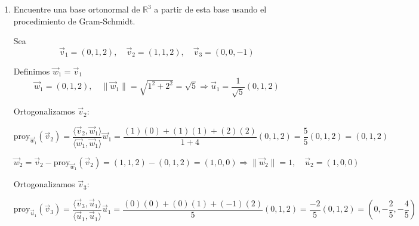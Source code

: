 \documentclass[a4paper]{article}
\begin{document}
\begin{enumerate}
\begin{enumerate}
Calculamos su determinante:

\[
\det(M) = 
\begin{vmatrix}
0 & 1 & 0 \\
1 & 1 & 0 \\
2 & 2 & -1
\end{vmatrix}
= 0 \cdot \begin{vmatrix} 1 & 0 \\ 2 & -1 \end{vmatrix}
- 1 \cdot \begin{vmatrix} 1 & 0 \\ 2 & -1 \end{vmatrix}
+ 0 \cdot \begin{vmatrix} 1 & 1 \\ 2 & 2 \end{vmatrix}
= - (1 \cdot (-1) - 0 \cdot 2) = -(-1) = 1
\]

Como el determinante es distinto de cero, los vectores son linealmente independientes, por lo tanto, al ser 3 vectores en espacio de dimensión 3, éstos forman una base de \( \mathbb{R}^3 \).

\vspace{0.4cm}

\item Encuentre una base ortonormal de \( \mathbb{R}^3 \) a partir de esta base usando el procedimiento de Gram-Schmidt.

Sea
\[
\vec{v}_1 = (0,1,2), \quad \vec{v}_2 = (1,1,2), \quad \vec{v}_3 = (0,0,-1)
\]

Definimos \( \vec{w}_1 = \vec{v}_1 \)
\[
\vec{w}_1 = (0,1,2), \quad
\|\vec{w}_1\| = \sqrt{1^2 + 2^2} = \sqrt{5}
\Rightarrow \vec{u}_1 = \frac{1}{\sqrt{5}}(0,1,2)
\]


Ortogonalizamos \( \vec{v}_2 \):

\[
\text{proy}_{\vec{w}_1}(\vec{v}_2) = \frac{\langle \vec{v}_2, \vec{w}_1 \rangle}{\langle \vec{w}_1, \vec{w}_1 \rangle} \vec{w}_1
= \frac{(1)(0)+(1)(1)+(2)(2)}{1+4} (0,1,2) = \frac{5}{5}(0,1,2) = (0,1,2)
\]

\[
\vec{w}_2 = \vec{v}_2 - \text{proy}_{\vec{w}_1}(\vec{v}_2) = (1,1,2) - (0,1,2) = (1,0,0)
\Rightarrow \|\vec{w}_2\| = 1, \quad \vec{u}_2 = (1,0,0)
\]

Ortogonalizamos \( \vec{v}_3 \):

\[
\text{proy}_{\vec{u}_1}(\vec{v}_3) = \frac{\langle \vec{v}_3, \vec{u}_1 \rangle}{\langle \vec{u}_1, \vec{u}_1 \rangle} \vec{u}_1
= \frac{(0)(0)+(0)(1)+(-1)(2)}{5}(0,1,2) = \frac{-2}{5}(0,1,2) = (0,-\frac{2}{5},-\frac{4}{5})
\]


\end{enumerate}
\end{enumerate}
\end{document}
